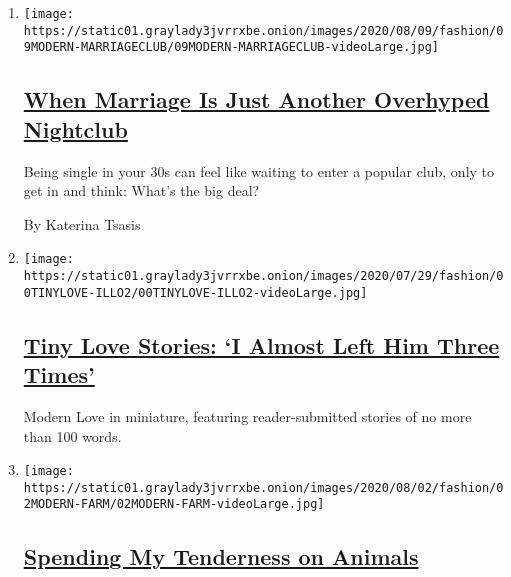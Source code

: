 \begin{enumerate}
\def\labelenumi{\arabic{enumi}.}
\item
  \texttt{[image: https://static01.graylady3jvrrxbe.onion/images/2020/08/09/fashion/09MODERN-MARRIAGECLUB/09MODERN-MARRIAGECLUB-videoLarge.jpg]}

  \hypertarget{when-marriage-is-just-another-overhyped-nightclub-1}{%
  \subsection{\texorpdfstring{\href{/2020/08/07/style/modern-love-when-marriage-is-just-another-overhyped-nightclub.html}{When
  Marriage Is Just Another Overhyped
  Nightclub}}{When Marriage Is Just Another Overhyped Nightclub}}\label{when-marriage-is-just-another-overhyped-nightclub-1}}

  Being single in your 30s can feel like waiting to enter a popular
  club, only to get in and think: What's the big deal?

  By Katerina Tsasis
\item
  \texttt{[image: https://static01.graylady3jvrrxbe.onion/images/2020/07/29/fashion/00TINYLOVE-ILLO2/00TINYLOVE-ILLO2-videoLarge.jpg]}

  \hypertarget{tiny-love-stories-i-almost-left-him-three-times}{%
  \subsection{\texorpdfstring{\href{/2020/08/04/style/tiny-modern-love-stories-coronavirus-i-almost-left-him.html}{Tiny
  Love Stories: `I Almost Left Him Three
  Times'}}{Tiny Love Stories: `I Almost Left Him Three Times'}}\label{tiny-love-stories-i-almost-left-him-three-times}}

  Modern Love in miniature, featuring reader-submitted stories of no
  more than 100 words.
\item
  \texttt{[image: https://static01.graylady3jvrrxbe.onion/images/2020/08/02/fashion/02MODERN-FARM/02MODERN-FARM-videoLarge.jpg]}

  \hypertarget{spending-my-tenderness-on-animals}{%
  \subsection{\texorpdfstring{\href{/2020/07/31/style/modern-love-spending-tenderness-on-animals.html}{Spending
  My Tenderness on
  Animals}}{Spending My Tenderness on Animals}}\label{spending-my-tenderness-on-animals}}


\end{enumerate}
